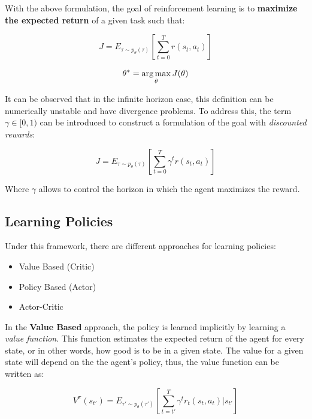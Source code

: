 With the above formulation, the goal of reinforcement learning is to \textbf{maximize the expected return} of a given task such that:

\begin{equation}
    J = E_{\tau \sim p_{\theta}(\tau)} \left[\sum_{t=0}^{T}r(s_{t}, a_{t})\right]
\end{equation}

\begin{equation}
    \theta^{*} = \operatorname*{arg\,max}_{\theta}J(\theta)
\label{eq:objective}
\end{equation}

It can be observed that in the infinite horizon case, this definition can be numerically unstable and have divergence problems. To address this, the term $\gamma \in [0, 1)$ can be introduced to construct a formulation of the goal with \emph{discounted rewards}:

\begin{equation}
    J = E_{\tau \sim p_{\theta}(\tau)} \left[\sum_{t=0}^{T}\gamma^{t}r(s_{t}, a_{t})\right]
\end{equation}

Where $\gamma$ allows to control the horizon in which the agent maximizes the reward.

\newpage

\subsection{Learning Policies}

Under this framework, there are different approaches for learning policies:

\begin{itemize}
    \item Value Based (Critic)
    \item Policy Based (Actor)
    \item Actor-Critic
\end{itemize}

In the \textbf{Value Based} approach, the policy is learned implicitly by learning a \emph{value function}. This function estimates the expected return of the agent for every state, or in other words, how good is to be in a given state. The value for a given state will depend on the the agent's policy, thus, the value function can be written as:

\begin{equation}
    V^{\pi}(s_{t'})  = E_{\tau' \sim p_{\theta}(\tau')}\left[\sum_{t=t'}^{T}\gamma^{t}r_{t}(s_{t}, a_{t})|s_{t'}\right]
\end{equation}


